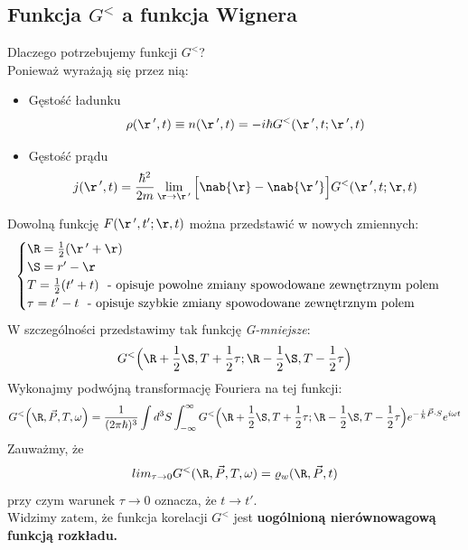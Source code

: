 \subsection{Funkcja $G^<$ a funkcja Wignera}
Dlaczego potrzebujemy funkcji $G^<$?\\
Ponieważ wyrażają się przez nią:
\begin{itemize}
\item Gęstość ładunku
\begin{equation}\rho(\r\,',t)\equiv n(\r\,',t)=-i\hbar G^<(\r\,',t;\r\,',t)
\end{equation}
\item Gęstość prądu
\begin{equation}j(\r\,',t)=\frac{\hbar^2}{2m}\lim_{\r\rightarrow \r\,'}
\Big[\nab{\r}-\nab{\r\,'}\Big] G^<(\r\,',t;\r,t)
\end{equation}
\end{itemize}
Dowolną funkcję $F(\r\,',t';\r,t)$ można przedstawić w nowych zmiennych:
\begin{equation}
\begin{cases}
\R=\frac{1}{2}(\r\,'+\r)\\
\S=r'-\r\\
T=\frac{1}{2}(t'+t)\text{~~- opisuje powolne zmiany spowodowane zewnętrznym polem}\\
\tau=t'-t\text{~~- opisuje szybkie zmiany spowodowane zewnętrznym polem}\\
\end{cases}
\end{equation}
W szczególności przedstawimy tak funkcję \textit{G-mniejsze}:
\begin{equation}
G^<\Big(\R+\frac{1}{2}\S,T+\frac{1}{2}\tau;\R-\frac{1}{2}\S,T-\frac{1}{2}\tau\Big)
\end{equation}
Wykonajmy podwójną transformację Fouriera na tej funkcji:
\begin{equation}
G^<\Big(\R,\vec{P},T,\omega\Big)=\frac{1}{(2\pi\hbar)^3}
\int d^3S\int_{-\infty}^{\infty} G^<\Big(\R+\frac{1}{2}\S,T+\frac{1}{2}\tau;\R-\frac{1}{2}\S,T-\frac{1}{2}\tau\Big)e^{-\frac{i}{\hbar}\vec{P}\cdot S}e^{i\omega t}
\end{equation}
Zauważmy, że
\begin{equation}lim_{\tau\rightarrow 0} G^<(\R,\vec{P},T,\omega)=\varrho_w(\R,\vec{P},t)
\end{equation}
przy czym warunek ${\tau\rightarrow 0}$ oznacza, że $t\rightarrow t'$.\\
Widzimy zatem, że funkcja korelacji $G^<$ jest\textbf{ uogólnioną nierównowagową funkcją rozkładu.}
